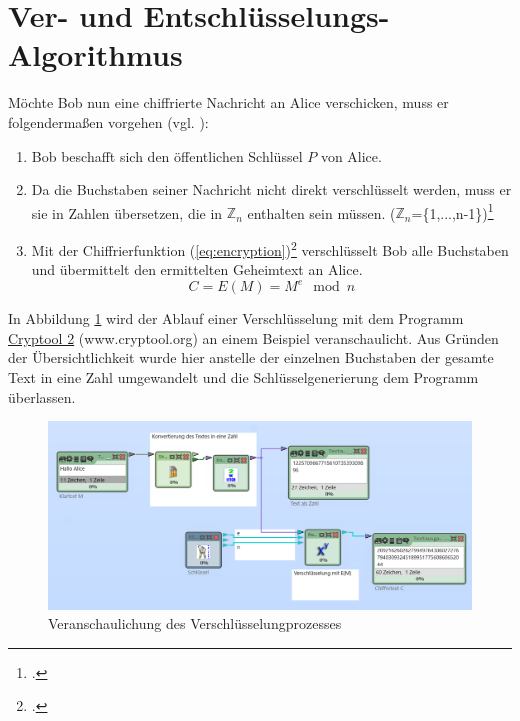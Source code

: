 \documentclass{scrarticle}
\begin{document}
    \section{Ver- und Entschlüsselungs-Algorithmus}
            Möchte Bob nun eine chiffrierte Nachricht an Alice verschicken, muss er folgendermaßen vorgehen (vgl. \cite[71]{watjen2008}):
            \begin{enumerate}
                \item Bob beschafft sich den öffentlichen Schlüssel $P$ von Alice.
                \item Da die Buchstaben seiner Nachricht nicht direkt verschlüsselt werden, muss er sie in Zahlen übersetzen, die in $\mathbb{Z}_n$ enthalten sein müssen. ($\mathbb{Z}_n$=\{1,...,n-1\})\footcite[161]{ertel2003}
                \item
                Mit der Chiffrierfunktion (\ref{eq:encryption})\footcite[77]{ertel2003} verschlüsselt Bob alle Buchstaben und übermittelt den ermittelten Geheimtext an Alice.
                \begin{equation}
                    C = E(M) = M^{e}\mod{n} \label{eq:encryption}
                \end{equation}
            \end{enumerate}
            In Abbildung \ref{fig:encrypt} wird der Ablauf einer Verschlüsselung mit dem Programm \href{www.cryptool.org}{Cryptool 2} (www.cryptool.org) an einem Beispiel veranschaulicht. Aus Gründen der Übersichtlichkeit wurde hier anstelle der einzelnen Buchstaben der gesamte Text in eine Zahl umgewandelt und die Schlüsselgenerierung dem Programm überlassen.
            \begin{figure}[h!]
                \includegraphics[width=\linewidth]{content/cryptool_encrypt_e1.png}
                \caption{Veranschaulichung des Verschlüsselungprozesses\protect\footnotemark}
                \label{fig:encrypt}
            \end{figure}
\end{document}

